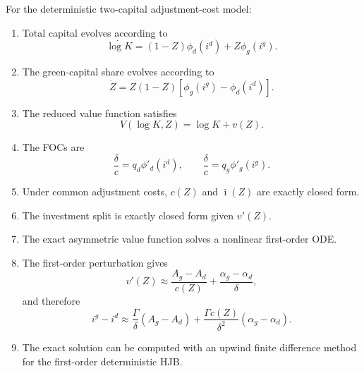 \documentclass[11pt]{article}
\newcommand{\ibar}{\bar\imath}
\begin{document}
For the deterministic two-capital adjustment-cost model:
\begin{enumerate}[label=(\roman*)]
    \item Total capital evolves according to
    \begin{equation}
        \dot{\log K}=(1-Z)\phi_d(i^d)+Z\phi_g(i^g).
    \end{equation}
    \item The green-capital share evolves according to
    \begin{equation}
        \dot Z=Z(1-Z)[\phi_g(i^g)-\phi_d(i^d)].
    \end{equation}
    \item The reduced value function satisfies
    \begin{equation}
        V(\log K,Z)=\log K+v(Z).
    \end{equation}
    \item The FOCs are
    \begin{equation}
        \frac{\delta}{c}=q_d\phi'_d(i^d),
        \qquad
        \frac{\delta}{c}=q_g\phi'_g(i^g).
    \end{equation}
    \item Under common adjustment costs, $c(Z)$ and $\ibar(Z)$ are exactly closed form.
    \item The investment split is exactly closed form given $v'(Z)$.
    \item The exact asymmetric value function solves a nonlinear first-order ODE.
    \item The first-order perturbation gives
    \begin{equation}
        v'(Z)\approx \frac{A_g-A_d}{c(Z)}+\frac{\alpha_g-\alpha_d}{\delta},
    \end{equation}
    and therefore
    \begin{equation}
        i^g-i^d
        \approx
        \frac{\Gamma}{\delta}(A_g-A_d)
        +
        \frac{\Gamma c(Z)}{\delta^2}(\alpha_g-\alpha_d).
    \end{equation}
    \item The exact solution can be computed with an upwind finite difference method for the first-order deterministic HJB.
\end{enumerate}
\end{document}
